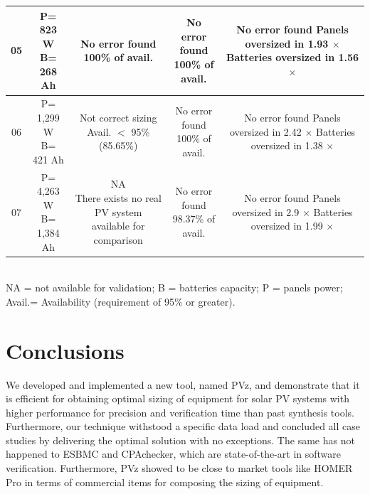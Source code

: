 \documentclass[review]{elsarticle}
\begin{document}
\begin{landscape}
\begin{table}
\begin{scriptsize}
\begin{tabular}{c|c|c|c|c}
\hline
05 & \makecell{P= 823 W\\B= 268 Ah} & \makecell{No error found \\100\% of avail.} & \makecell{No error found \\100\% of avail.} & \makecell{No error found\\Panels oversized in 1.93 $\times$\\Batteries oversized in 1.56 $\times$}\\
\hline
06 & \makecell{P= 1,299 W\\B= 421 Ah} & \makecell{Not correct sizing \\Avail. $<$ 95\%\\(85.65\%)} & \makecell{No error found \\100\% of avail.} & \makecell{No error found\\Panels oversized in 2.42 $\times$\\Batteries oversized in 1.38 $\times$}\\
\hline
07 & \makecell{P= 4,263 W\\B= 1,384 Ah} & \makecell{NA\\There exists no real PV system\\available for comparison} & \makecell{No error found \\98.37\% of avail.} & \makecell{No error found\\Panels oversized in 2.9 $\times$\\Batteries oversized in 1.99 $\times$}\\
\hline
\hline
\end{tabular}
\\NA = not available for validation; B = batteries capacity; P = panels power; Avail.= Availability (requirement of 95\% or greater).
\end{scriptsize}
\end{table}
\end{landscape}


\section{Conclusions} 
\label{sec:Conclusions}
We developed and implemented a new tool, named PVz, and demonstrate that it is efficient for obtaining optimal sizing of equipment for solar PV systems with higher performance for precision and verification time than past synthesis tools. Furthermore, our technique withstood a specific data load and concluded all case studies by delivering the optimal solution with no exceptions. The same has not happened to ESBMC and CPAchecker, which are state-of-the-art in software verification. Furthermore, PVz showed to be close to market tools like HOMER Pro in terms of commercial items for composing the sizing of equipment. 
\end{document}
